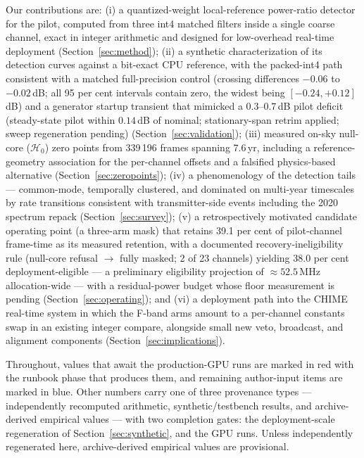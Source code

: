 Our contributions are:
(i) a quantized-weight local-reference power-ratio detector for the pilot, computed from
three int4 matched filters inside a single coarse channel, exact in integer
arithmetic and designed for low-overhead real-time deployment
(Section~\ref{sec:method});
(ii) a synthetic characterization of its detection curves against a
bit-exact CPU reference, with the packed-int4 path consistent with a
matched full-precision control (crossing differences $-0.06$ to
$-0.02$\,dB; all 95 per cent intervals contain zero, the widest being
$[-0.24, +0.12]$\,dB) and a generator startup transient that mimicked
a $0.3$--$0.7$\,dB pilot deficit (steady-state pilot within
$0.14$\,dB of nominal; stationary-span retrim applied; sweep
regeneration pending)
(Section~\ref{sec:validation});
(iii) measured on-sky null-core ($\mathcal{H}_0$) zero points from
339\,196 frames spanning 7.6\,yr,
including a reference-geometry association for the per-channel offsets and
a falsified physics-based alternative (Section~\ref{sec:zeropoints});
(iv) a phenomenology of the detection tails --- common-mode, temporally
clustered, and dominated on multi-year timescales by rate transitions
consistent with transmitter-side events including the 2020 spectrum repack
(Section~\ref{sec:survey});
(v) a retrospectively motivated candidate operating point (a
three-arm mask) that retains
39.1 per cent of pilot-channel frame-time as its measured retention,
with a documented recovery-ineligibility rule (null-core refusal
$\rightarrow$ fully masked; 2 of 23 channels) yielding 38.0 per cent
deployment-eligible --- a
preliminary eligibility projection of $\approx 52.5$\,MHz allocation-wide
--- with a residual-power budget whose floor measurement is pending
(Section~\ref{sec:operating});
and (vi) a deployment path into the CHIME real-time system in which the
F-band arms amount to a per-channel constants swap in an existing integer
compare, alongside small new veto, broadcast, and alignment components
(Section~\ref{sec:implications}).

Throughout, values that await the production-GPU runs are marked in red
with the runbook phase that produces them, and remaining author-input
items are marked in blue. Other numbers carry one of three provenance
types --- independently recomputed arithmetic, synthetic/testbench
results, and archive-derived empirical values --- with two completion
gates: the deployment-scale regeneration of
Section~\ref{sec:synthetic}, and the GPU runs. Unless independently
regenerated here, archive-derived empirical values are provisional.


